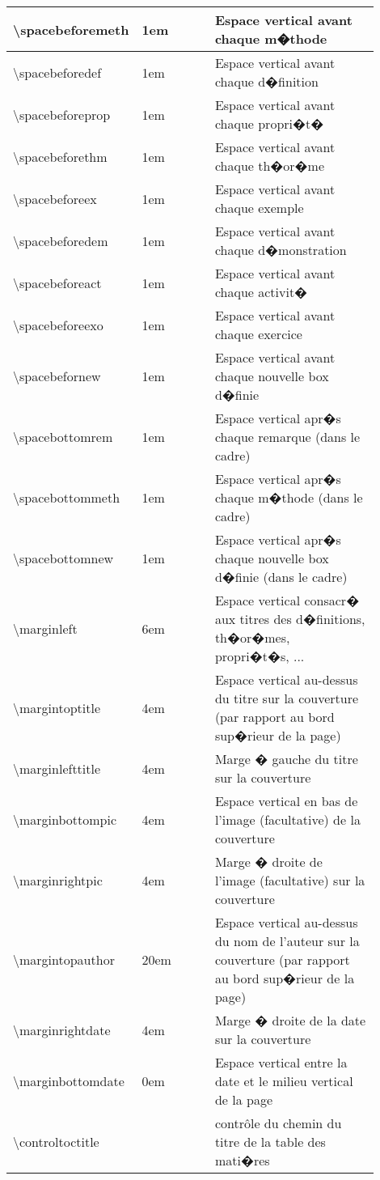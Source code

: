 \documentclass[ams,openany,10pt,presentation,latin1]{mathbook}
\begin{document}
\begin{center}
\begin{longtable}{|>{\ttfamily\centering}m{0.25\linewidth}|>{\centering}m{0.2\linewidth}|m{0.45\linewidth}|}
\hline
\textbackslash spacebeforemeth & 1em & Espace vertical avant chaque m�thode\\
\hline
\textbackslash spacebeforedef & 1em & Espace vertical avant chaque d�finition\\
\hline
\textbackslash spacebeforeprop & 1em & Espace vertical avant chaque propri�t�\\
\hline
\textbackslash spacebeforethm & 1em & Espace vertical avant chaque th�or�me\\
\hline
\textbackslash spacebeforeex & 1em & Espace vertical avant chaque exemple\\
\hline
\textbackslash spacebeforedem & 1em & Espace vertical avant chaque d�monstration\\
\hline
\textbackslash spacebeforeact & 1em & Espace vertical avant chaque activit�\\
\hline
\textbackslash spacebeforeexo & 1em & Espace vertical avant chaque exercice\\
\hline
\textbackslash spacebefornew & 1em & Espace vertical avant chaque nouvelle box d�finie\\
\hline
\textbackslash spacebottomrem & 1em & Espace vertical apr�s chaque remarque (dans le cadre)\\
\hline
\textbackslash spacebottommeth & 1em & Espace vertical apr�s chaque m�thode (dans le cadre)\\
\hline
\textbackslash spacebottomnew & 1em & Espace vertical apr�s chaque nouvelle box d�finie (dans le cadre)\\
\hline
\textbackslash marginleft & 6em & Espace vertical consacr� aux titres des d�finitions, th�or�mes, propri�t�s, ...\\
\hline
\textbackslash margintoptitle & 4em & Espace vertical au-dessus du titre sur la couverture (par rapport au bord sup�rieur de la page)\\
\hline
\textbackslash marginlefttitle & 4em & Marge � gauche du titre sur la couverture\\
\hline
\textbackslash marginbottompic & 4em & Espace vertical en bas de l'image (facultative) de la couverture\\
\hline
\textbackslash marginrightpic & 4em & Marge � droite de l'image (facultative) sur la couverture\\
\hline
\textbackslash margintopauthor & 20em & Espace vertical au-dessus du nom de l'auteur sur la couverture (par rapport au bord sup�rieur de la page)\\
\hline
\textbackslash marginrightdate & 4em & Marge � droite de la date sur la couverture\\
\hline
\textbackslash marginbottomdate & 0em & Espace vertical entre la date et le milieu vertical de la page\\
\hline
\textbackslash controltoctitle & 0.25cm & contr\^ole du chemin du titre de la table des mati�res\\
\hline
\end{longtable}
\end{center}
\end{document}
